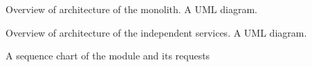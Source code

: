 

Overview of architecture of the monolith.
A UML diagram.

Overview of architecture of the independent services.
A UML diagram.


A sequence chart of the module and its requests